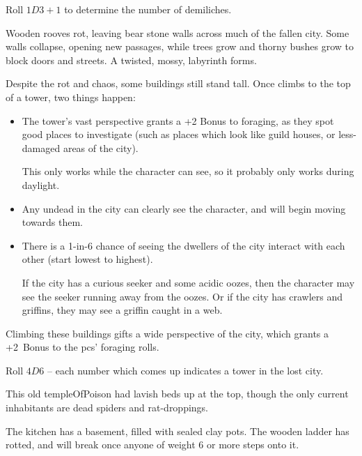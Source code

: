 \begin{multicols}{2}
\begin{dlist}
  Roll $1D3 + 1$ to determine the number of demiliches.
\end{dlist}

\label{lostTowers}

Wooden rooves rot, leaving bear stone walls across much of the fallen city.
Some walls collapse, opening new passages, while trees grow and thorny bushes grow to block doors and streets.
A twisted, mossy, labyrinth forms.

Despite the rot and chaos, some buildings still stand tall.
Once  climbs to the top of a tower, two things happen:


\begin{itemize}
  \item
  The tower's vast perspective grants a +2 Bonus to foraging, as they spot good places to investigate (such as places which look like guild houses, or less-damaged areas of the city).

  This only works while the character can see, so it probably only works during daylight.
  \item
  Any undead in the city can clearly see the character, and will begin moving towards them.
  \item
  There is a 1-in-6 chance of seeing the dwellers of the city interact with each other (start lowest to highest).

  If the city has a curious \gls{seeker} and some acidic oozes, then the character may see the \gls{seeker} running away from the oozes.
  Or if the city has \glspl{crawler} and griffins, they may see a griffin caught in a web.
\end{itemize}

Climbing these buildings gifts a wide perspective of the city, which grants a +2~Bonus to the \glspl{pc}' foraging rolls.

Roll $4D6$ -- each number which comes up indicates a tower in the lost city.

\begin{dlist}
  \item
  This old \gls{templeOfPoison} had lavish beds up at the top, though the only current inhabitants are dead spiders and rat-droppings.

  The kitchen has a basement, filled with sealed clay pots.
  The wooden ladder has rotted, and will break once anyone of \gls{weight} 6 or more steps onto it.


\end{dlist}
\end{multicols}
